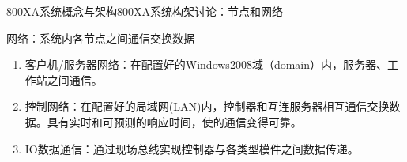 \documentclass[12pt,hyperref={CJKbookmarks=true}]{beamer} %
\begin{document}
\begin{frame}{800XA系统概念与架构}{800XA系统构架讨论：节点和网络}
\begin{block}{网络：系统内各节点之间通信交换数据}
			\begin{enumerate}
				\item  客户机/服务器网络：在配置好的Windows2008域（domain）内，服务器、工作站之间通信。
				
				\item  控制网络：在配置好的局域网(LAN)内，控制器和互连服务器相互通信交换数据。具有实时和可预测的响应时间，使的通信变得可靠。
				
				\item  IO数据通信：通过现场总线实现控制器与各类型模件之间数据传递。
			\end{enumerate}
		\end{block}
	\end{frame}
\end{document}

